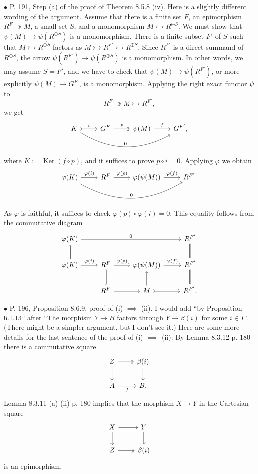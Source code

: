 \documentclass[12pt]{article}
\theoremstyle{remark}%
\newcommand{\bu}{\bullet}
\newcommand{\n}{\noindent}
\newcommand{\epi}{\twoheadrightarrow}
\newcommand{\m}{\rightarrowtail}
\newcommand{\p}{\varphi}
\DeclareMathOperator{\Ker}{Ker}
\begin{document}
\n$\bu$ P. 191, Step (a) of the proof of Theorem 8.5.8 (iv). Here is a slightly different wording of the argument. Assume that there is a finite set $F$, an epimorphism $R^F\epi M$, a small set $S$, and a monomorphism $M\m R^{\oplus S}$. We must show that $\psi(M)\to\psi(R^{\oplus S})$ is a monomorphism. There is a finite subset $F'$ of $S$ such that $M\m R^{\oplus S}$ factors as $M\m R^{F'}\m R^{\oplus S}$. Since $R^{F'}$ is a direct summand of $R^{\oplus S}$, the arrow $\psi(R^{F'})\to\psi(R^{\oplus S})$ is a monomorphism. In other words, we may assume $S=F'$, and we have to check that $\psi(M)\to\psi(R^{F'})$, or more explicitly $\psi(M)\to G^{F'}$, is a monomorphism. Applying the right exact functor $\psi$ to 
$$
R^F\epi M\m R^{F'},
$$
we get 
$$
\begin{tikzcd}
K\ar[tail]{r}{i}\ar[bend right]{rrr}{0}&G^F\ar[two heads]{r}{p}&\psi(M)\ar{r}{f}&G^{F'},
\end{tikzcd}
$$
where $K:=\Ker(f\circ p)$, and it suffices to prove $p\circ i=0$. Applying $\p$ we obtain
$$
\begin{tikzcd}
\p(K)\ar{r}{\p(i)}\ar[bend right]{rrr}{0}&R^F\ar{r}{\p(p)}&\p(\psi(M))\ar{r}{\p(f)}&R^{F'}.
\end{tikzcd}
$$
As $\p$ is faithful, it suffices to check $\p(p)\circ\p(i)=0$. This equality follows from the commutative diagram
$$
\begin{tikzcd}
\p(K)\ar[equal]{d}\ar{rrr}{0}&&&R^{F'}\ar[equal]{d}\\
\p(K)\ar{r}{\p(i)}&R^F\ar[equal]{d}\ar{r}{\p(p)}&\p(\psi(M))\ar{r}{\p(f)}&R^{F'}\ar[equal]{d}\\
&R^F\ar{r}&M\ar[tail]{r}\ar{u}&R^{F'}.
\end{tikzcd}
$$ 


\n$\bu$ P. 196, Proposition 8.6.9, proof of (i) $\implies$ (ii). I would add ``by Proposition 6.1.13'' after ``The morphism $Y\to B$ factors through $Y\to\beta(i)$ for some $i\in I$''. (There might be a simpler argument, but I don't see it.) Here are some more details for the last sentence of the proof of (i) $\implies$ (ii): By Lemma 8.3.12 p. 180 there is a commutative square 
$$
\begin{tikzcd}
Z\ar[two heads]{r}\ar{d}&\beta(i)\ar{d}\\
A\ar{r}[swap]{f}&B.
\end{tikzcd}
$$
Lemma 8.3.11 (a) (ii) p. 180 implies that the morphism $X\to Y$ in the Cartesian square
$$
\begin{tikzcd}
X\ar{r}\ar{d}&Y\ar{d}\\
Z\ar[two heads]{r}&\beta(i) 
\end{tikzcd}
$$
is an epimorphism. 
%
\end{document}
